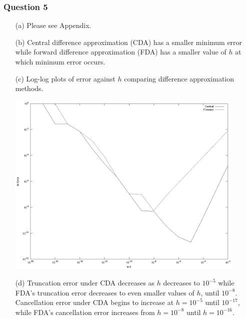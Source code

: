 \documentclass[11pt,a4paper]{article}
\begin{document}
\subsubsection*{Question 5}
\begin{enumerate}
	\item[(a)] Please see Appendix.
	\item[(b)] Central difference approximation (CDA) has a smaller minimum error while forward difference approximation (FDA) has a smaller value of $h$ at which minimum error occurs.
	\item[(c)] Log-log plots of error against $h$ comparing difference approximation methods.
	\begin{center}
		\includegraphics[width=0.9\textwidth]{plot5c.eps}
	\end{center}
	\item[(d)] Truncation error under CDA decreases as $h$ decreases to $10^{-5}$ while FDA's truncation error decreases to even smaller values of $h$, until $10^{-8}$. Cancellation error under CDA begins to increase at $h=10^{-5}$ until $10^{-17}$, while FDA's cancellation error increases from $h=10^{-8}$ until $h=10^{-16}$.
\end{enumerate}
\pagebreak
\end{document}
